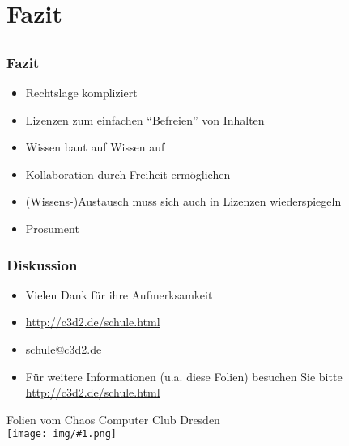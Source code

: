 \documentclass[table]{beamer}
\newcommand{\cc}[1]{\texttt{[image: img/\#1.png]}}
\begin{document}
\section{Fazit}
\subsection{}

\begin{frame}
    \frametitle{Fazit}
    \begin{itemize}
      \item<2-> Rechtslage kompliziert
      \item<3-> Lizenzen zum einfachen ``Befreien'' von Inhalten
      \item<4-> Wissen baut auf Wissen auf
      \item<5-> Kollaboration durch Freiheit ermöglichen
      \item<6-> (Wissens-)Austausch muss sich auch in Lizenzen wiederspiegeln
      \item<7-> Prosument
    \end{itemize}
\end{frame}

\begin{frame}
    \frametitle{Diskussion}
    \begin{itemize}
        \item Vielen Dank für ihre Aufmerksamkeit
        \item \url{http://c3d2.de/schule.html}
        \item \url{schule@c3d2.de}
        \item Für weitere Informationen (u.a. diese Folien) besuchen Sie bitte \url{http://c3d2.de/schule.html}
    \end{itemize}
    \begin{center}
   Folien vom Chaos Computer Club Dresden\\
   {\cc{by-sa}}
   \end{center}
\end{frame}
\end{document}

